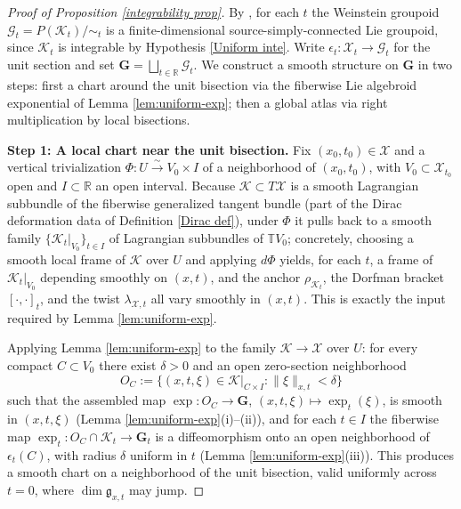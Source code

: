 \documentclass[reqno]{amsart}
\theoremstyle{plain}
\theoremstyle{definition}
\newcommand{\X}{\mathcal{X}}
\newcommand{\K}{\mathcal{K}}
\begin{document}
\begin{proof}[Proof of Proposition \ref{integrability prop}]
By \cite[Theorem 4.1]{crainic2003integrability}, for each $t$ the Weinstein groupoid $\mathcal{G}_t = P(\K_t)/\!\sim_t$ is a finite-dimensional source-simply-connected Lie groupoid, since $\K_t$ is integrable by Hypothesis \ref{Uniform inte}.
Write $\epsilon_t : \X_t \to \mathcal{G}_t$ for the unit section and set $\mathbf{G} = \bigsqcup_{t \in \mathbb{R}} \mathcal{G}_t$. We construct a smooth structure on $\mathbf{G}$ in two steps: first a chart around the unit bisection
via the fiberwise Lie algebroid exponential of Lemma \ref{lem:uniform-exp}; then a global atlas via right multiplication by local bisections.

\medskip
\noindent\textbf{Step 1: A local chart near the unit bisection.}
Fix $(x_0, t_0) \in \X$ and a vertical trivialization
$\Phi : U \xrightarrow{\ \sim\ } V_0 \times I$ of a neighborhood of $(x_0, t_0)$, with $V_0 \subset \X_{t_0}$ open and $I \subset \mathbb{R}$ an open interval.
Because $\K \subset T\X$ is a smooth Lagrangian subbundle of the
fiberwise generalized tangent bundle (part of the Dirac deformation data of Definition \ref{Dirac def}), under $\Phi$ it pulls back to a smooth
family $\{\K_t|_{V_0}\}_{t \in I}$ of Lagrangian subbundles of $\mathbb{T}V_0$; concretely, choosing a smooth local frame of $\K$ over $U$ and applying $d\Phi$ yields, for each $t$, a frame of $\K_t|_{V_0}$ depending smoothly on $(x,t)$, and the anchor $\rho_{\K_t}$, the Dorfman bracket $[\cdot,\cdot]_t$, and
the twist $\lambda_{\X,t}$ all vary smoothly in $(x,t)$. This is exactly the input required by Lemma \ref{lem:uniform-exp}.

Applying Lemma \ref{lem:uniform-exp} to the family $\K \to \X$
over $U$: for every compact $C \subset V_0$ there exist $\delta > 0$ and an open zero-section neighborhood
\[
  O_C := \bigl\{(x,t,\xi) \in \K|_{C \times I} : \|\xi\|_{x,t} < \delta \bigr\}
\]
such that the assembled map $\exp : O_C \to \mathbf{G}$, $(x,t,\xi) \mapsto \exp_t(\xi)$,
is smooth in $(x,t,\xi)$ (Lemma \ref{lem:uniform-exp}(i)--(ii)), and for each $t \in I$ the fiberwise map $\exp_t : O_C \cap \K_t \to \mathbf{G}_t$ is a diffeomorphism onto an open neighborhood of $\epsilon_t(C)$, with radius $\delta$ uniform in $t$ (Lemma \ref{lem:uniform-exp}(iii)). This produces a smooth
chart on a neighborhood of the unit bisection, valid uniformly across $t = 0$, where $\dim \mathfrak{g}_{x,t}$ may jump.


\end{proof}
\end{document}
